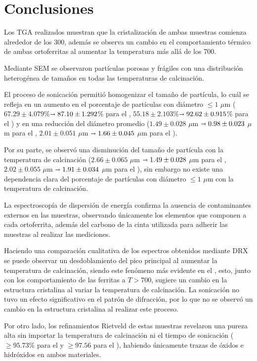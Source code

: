 \documentclass[../main.tex]{subfiles}
\begin{document}
\chapter{Conclusiones}
Los TGA realizados muestran que la cristalización de ambas muestras comienza alrededor de los 300\gradoC{}, además se observa un cambio en el comportamiento térmico de ambas ortoferritas al aumentar la temperatura más allá de los 700\gradoC{}.

Mediante SEM se observaron partículas porosas y frágiles con una distribución heterogénea de tamaños en todas las temperaturas de calcinación. 

El proceso de sonicación permitió homogenizar el tamaño de partícula, lo cuál se refleja en un aumento en el porcentaje de partículas con diámetro $\leq1$ $\mu$m ($67.29\pm4.079$\%$\shortrightarrow87.10\pm1.292$\% para el \neod{}, $55.18\pm2.103$\%$\shortrightarrow92.62\pm0.915$\% para el \sama{}) y en una reducción del diámetro promedio ($1.49\pm0.028$ $\mu$m $\shortrightarrow0.98\pm0.023$ $\mu$m para el \neod{}, $2.01\pm0.051$ $\mu$m $\shortrightarrow1.66\pm0.045$ $\mu$m para el \sama{}).

Por su parte, se observó una disminución del tamaño de partícula con la temperatura de calcinación ($2.66\pm0.065$ $\mu$m $\shortrightarrow1.49\pm0.028$ $\mu$m para el \neod{}, $2.02\pm0.055$ $\mu$m $\shortrightarrow1.91\pm0.034$ $\mu$m para el \sama{}), sin embargo no existe una dependencia clara del porcentaje de partículas con diámetro $\leq1$ $\mu$m con la temperatura de calcinación.

La espectroscopía de dispersión de energía confirma la ausencia de contaminantes externos en las muestras, observando únicamente los elementos que componen a cada ortoferrita, además del carbono de la cinta utilizada para adherir las muestras al realizar las mediciones.

Haciendo una comparación cualitativa de los espectros obtenidos mediante DRX se puede observar un desdoblamiento del pico principal al aumentar la temperatura de calcinación, siendo este fenómeno más evidente en el \neod{}, esto, junto con los comportamiento de las ferritas a $T>700$\gradoC{}, sugiere un cambio en la estructura cristalina al variar la temperatura de calcinación. La sonicación no tuvo un efecto significativo en el patrón de difracción, por lo que no se observó un cambio en la estructura cristalina al realizar este proceso.

Por otro lado, los refinamientos Rietveld de estas muestras revelaron una pureza alta sin importar la temperatura de calcinación ni el tiempo de sonicación ($\geq95.73$\% para el \neod{} y $\geq97.56$ para el \sama{}), habiendo únicamente trazas de óxidos e hidróxidos en ambos materiales.
\end{document}
